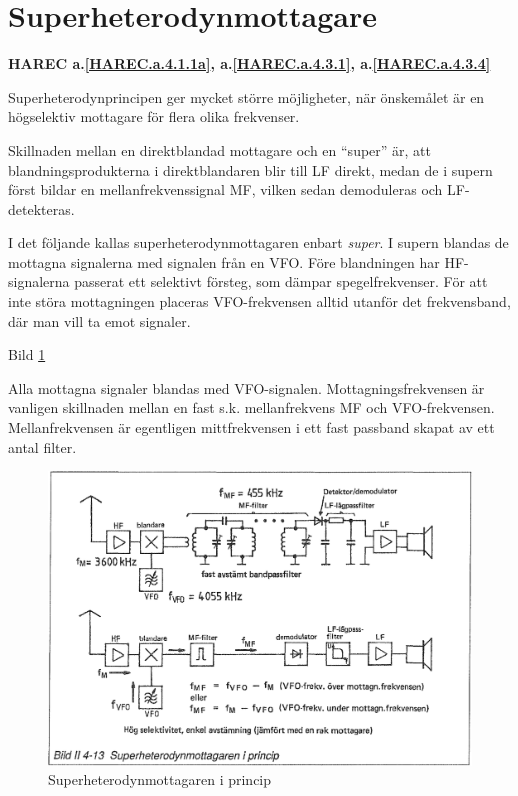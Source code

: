 \section{Superheterodynmottagare}
\textbf{
HAREC a.\ref{HAREC.a.4.1.1a}\label{myHAREC.a.4.1.1a},
 a.\ref{HAREC.a.4.3.1}\label{myHAREC.a.4.3.1},
 a.\ref{HAREC.a.4.3.4}\label{myHAREC.a.4.3.4}
}

Superheterodynprincipen ger mycket större möjligheter, när önskemålet
är en högselektiv mottagare för flera olika frekvenser.

Skillnaden mellan en direktblandad mottagare och en ``super'' är, att
blandningsprodukterna i direktblandaren blir till LF direkt, medan de
i supern först bildar en mellanfrekvenssignal MF, vilken sedan
demoduleras och LF-detekteras.

I det följande kallas superheterodynmottagaren enbart \emph{super}. I
supern blandas de mottagna signalerna med signalen från en VFO. Före
blandningen har HF-signalerna passerat ett selektivt försteg, som
dämpar spegelfrekvenser. För att inte störa mottagningen placeras
VFO-frekvensen alltid utanför det frekvensband, där man vill ta emot
signaler.

Bild \ref{fig:bildII4-13}

Alla mottagna signaler blandas med VFO-signalen. Mottagningsfrekvensen
är vanligen skillnaden mellan en fast s.k. mellanfrekvens MF och
VFO-frekvensen. Mellanfrekvensen är egentligen mittfrekvensen i ett
fast passband skapat av ett antal filter.

\begin{figure}
  \includegraphics[width=\textwidth]{images/bild_2_4-13}
  \caption{Superheterodynmottagaren i princip}
  \label{fig:bildII4-13}
\end{figure}

